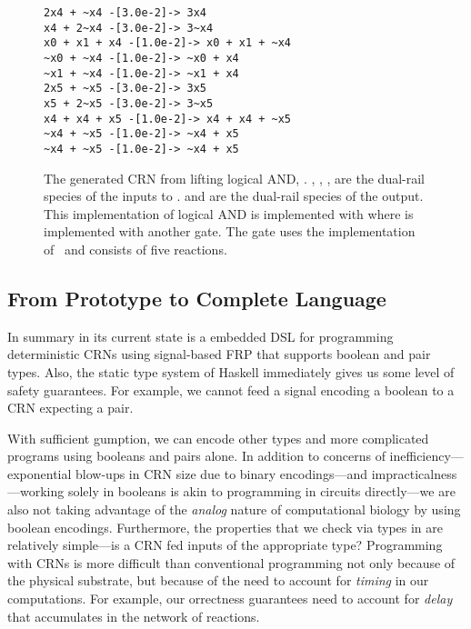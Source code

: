\begin{figure}
\begin{center}
\begin{BVerbatim}
2x4 + ~x4 -[3.0e-2]-> 3x4
x4 + 2~x4 -[3.0e-2]-> 3~x4
x0 + x1 + x4 -[1.0e-2]-> x0 + x1 + ~x4
~x0 + ~x4 -[1.0e-2]-> ~x0 + x4
~x1 + ~x4 -[1.0e-2]-> ~x1 + x4
2x5 + ~x5 -[3.0e-2]-> 3x5
x5 + 2~x5 -[3.0e-2]-> 3~x5
x4 + x4 + x5 -[1.0e-2]-> x4 + x4 + ~x5
~x4 + ~x5 -[1.0e-2]-> ~x4 + x5
~x4 + ~x5 -[1.0e-2]-> ~x4 + x5
\end{BVerbatim}
\caption{The generated CRN from lifting logical AND, .
  , , ,  are the dual-rail species of the inputs to \hask{(&&)}.
   and  are the dual-rail species of the output.
  This implementation of logical AND is implemented with  where  is implemented with another  gate.
  The  gate uses the implementation of~\cite{rdc} and consists of five reactions.
  }
\label{fig:and-crn}
\end{center}
\end{figure}

\subsection{From Prototype to Complete Language}

In summary \reactamole{} in its current state is a embedded DSL for programming deterministic CRNs using signal-based FRP that supports boolean and pair types.
Also, the static type system of Haskell immediately gives us some level of safety guarantees.
For example, we cannot feed a signal encoding a boolean to a CRN expecting a pair.

With sufficient gumption, we can encode other types and more complicated programs using booleans and pairs alone.
In addition to concerns of inefficiency---exponential blow-ups in CRN size due to binary encodings---and impracticalness---working solely in booleans is akin to programming in circuits directly---we are also not taking advantage of the \emph{analog} nature of computational biology by using boolean encodings.
Furthermore, the properties that we check via types in \reactamole{} are relatively simple---is a CRN fed inputs of the appropriate type?
Programming with CRNs is more difficult than conventional programming not only because of the physical substrate, but because of the need to account for \emph{timing} in our computations.
For example, our orrectness guarantees need to account for \emph{delay} that accumulates in the network of reactions.

